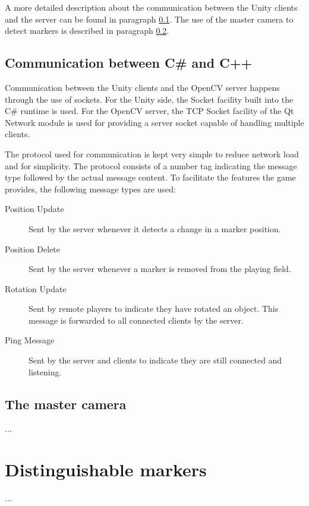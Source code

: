         A more detailed description about the communication between the Unity 
        clients and the server can be found in paragraph \ref{ssec:communication}.
        The use of the master camera to detect markers is described in paragraph
        \ref{ssec:mastercamera}.
                
        \subsection{Communication between C\# and C++} \label{ssec:communication}
            Communication between the Unity clients and the OpenCV server 
            happens through the use of sockets. For the Unity side, the Socket 
            facility built into the C\# runtime is used. For the OpenCV server, 
            the TCP Socket facility of the Qt Network module is used for 
            providing a server socket capable of handling multiple clients. 
            
            The protocol used for communication is kept very simple to reduce 
            network load and for simplicity. The protocol consists of a number
            tag indicating the message type followed by the actual message 
            content. To facilitate the features the game provides, the following
            message types are used:
            
            \begin{description}
                \item[Position Update] Sent by the server whenever it detects a 
                                       change in a marker position.
                \item[Position Delete] Sent by the server whenever a marker is
                                       removed from the playing field.
                \item[Rotation Update] Sent by remote players to indicate they 
                                       have rotated an object. This message is 
                                       forwarded to all connected clients by the
                                       server.
                \item[Ping Message]    Sent by the server and clients to indicate 
                                       they are still connected and listening.
            \end{description}
        
        \subsection{The master camera} \label{ssec:mastercamera}
            ...
            
    \section{Distinguishable markers} \label{sec:markers}
        ...